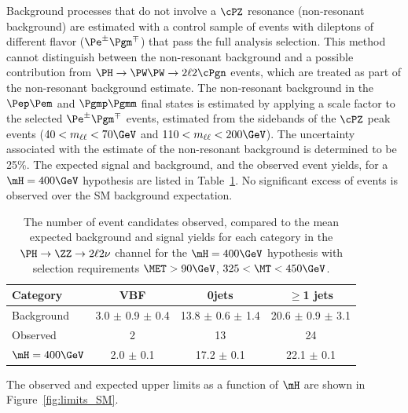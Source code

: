 Background processes that do not involve a $\cPZ$ resonance (non-resonant background) are estimated with a control
sample of events with dileptons of different flavor ($\Pe^{\pm}\Pgm^{\mp}$) that pass the full analysis selection.
This method cannot distinguish between the non-resonant background and a possible contribution from
$\PH \rightarrow \PW\PW \rightarrow 2\ell 2\cPgn$ events, which are treated as part of the non-resonant background
estimate. The non-resonant background in the $\Pep\Pem$ and $\Pgmp\Pgmm$ final states is estimated by applying a
scale factor to the selected $\Pe^{\pm}\Pgm^{\mp}$ events, estimated from the sidebands of the $\cPZ$ peak events
($40 < m_{\ell\ell} < 70\GeV$ and $110 < m_{\ell\ell} < 200\GeV$). The uncertainty associated with the estimate of the
non-resonant background is determined to be 25\%. The expected signal and background, and the observed event yields, for 
a $\mH=400\GeV$ hypothesis are listed in Table~\ref{tab:final_yields}. No significant excess of events is observed over
the SM background expectation.

\begin{table}[htbp]
\begin{center}
\caption{
The number of event candidates observed, compared to the mean expected 
background and signal yields for each category {in the $\PH \to \ZZ \to 2\ell 2\nu$ channel}
for the $\mH=400\GeV$ hypothesis with selection requirements $\MET>90\GeV$, $325<\MT<450\GeV$. 
}
\label{tab:final_yields}
\begin{tabular}{l|c|c|c}
\hline
Category & VBF & 0jets & $\geq$1 jets \\
\hline
Background &  3.0 $\pm$ 0.9 $\pm$ 0.4 &  13.8 $\pm$ 0.6 $\pm$ 1.4  &  20.6 $\pm$ 0.9 $\pm$ 3.1 \\ %
\hline
Observed  & 2 & 13  & 24 \\ %
\hline
$\mH = 400\GeV$ & 2.0 $\pm$ 0.1 & 17.2 $\pm$ 0.1 & 22.1 $\pm$ 0.1 \\ %
\hline
\end{tabular}
\end{center}
\end{table}

The observed and expected upper limits as a function of $\mH$ are shown in Figure~\ref{fig:limits_SM}. 


